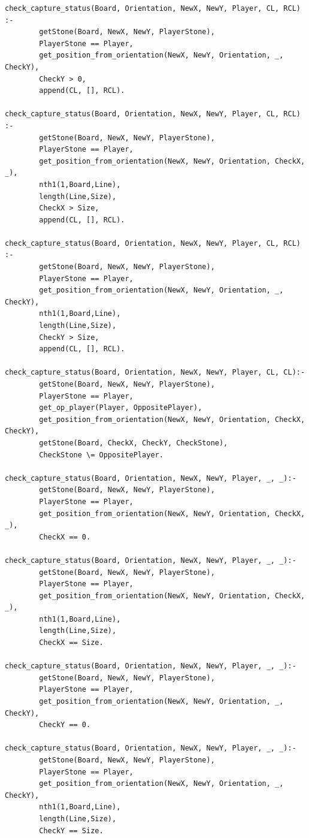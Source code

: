 \documentclass[a4paper]{article}
\begin{document}
\begin{lstlisting}
check_capture_status(Board, Orientation, NewX, NewY, Player, CL, RCL) :- 
        getStone(Board, NewX, NewY, PlayerStone),
        PlayerStone == Player,
        get_position_from_orientation(NewX, NewY, Orientation, _, CheckY),
        CheckY > 0,
        append(CL, [], RCL).

check_capture_status(Board, Orientation, NewX, NewY, Player, CL, RCL) :- 
        getStone(Board, NewX, NewY, PlayerStone),
        PlayerStone == Player,
        get_position_from_orientation(NewX, NewY, Orientation, CheckX, _),
        nth1(1,Board,Line),
        length(Line,Size),
        CheckX > Size,
        append(CL, [], RCL).

check_capture_status(Board, Orientation, NewX, NewY, Player, CL, RCL) :- 
        getStone(Board, NewX, NewY, PlayerStone),
        PlayerStone == Player,
        get_position_from_orientation(NewX, NewY, Orientation, _, CheckY),
        nth1(1,Board,Line),
        length(Line,Size),
        CheckY > Size,
        append(CL, [], RCL).

check_capture_status(Board, Orientation, NewX, NewY, Player, CL, CL):-
        getStone(Board, NewX, NewY, PlayerStone),
        PlayerStone == Player,
        get_op_player(Player, OppositePlayer),
        get_position_from_orientation(NewX, NewY, Orientation, CheckX, CheckY),
        getStone(Board, CheckX, CheckY, CheckStone),
        CheckStone \= OppositePlayer.

check_capture_status(Board, Orientation, NewX, NewY, Player, _, _):-
        getStone(Board, NewX, NewY, PlayerStone),
        PlayerStone == Player,
        get_position_from_orientation(NewX, NewY, Orientation, CheckX, _),
        CheckX == 0.

check_capture_status(Board, Orientation, NewX, NewY, Player, _, _):-
        getStone(Board, NewX, NewY, PlayerStone),
        PlayerStone == Player,
        get_position_from_orientation(NewX, NewY, Orientation, CheckX, _),
        nth1(1,Board,Line),
        length(Line,Size),
        CheckX == Size.

check_capture_status(Board, Orientation, NewX, NewY, Player, _, _):-
        getStone(Board, NewX, NewY, PlayerStone),
        PlayerStone == Player,
        get_position_from_orientation(NewX, NewY, Orientation, _, CheckY),
        CheckY == 0.

check_capture_status(Board, Orientation, NewX, NewY, Player, _, _):-
        getStone(Board, NewX, NewY, PlayerStone),
        PlayerStone == Player,
        get_position_from_orientation(NewX, NewY, Orientation, _, CheckY),
        nth1(1,Board,Line),
        length(Line,Size),
        CheckY == Size.


\end{lstlisting}
\end{document}
